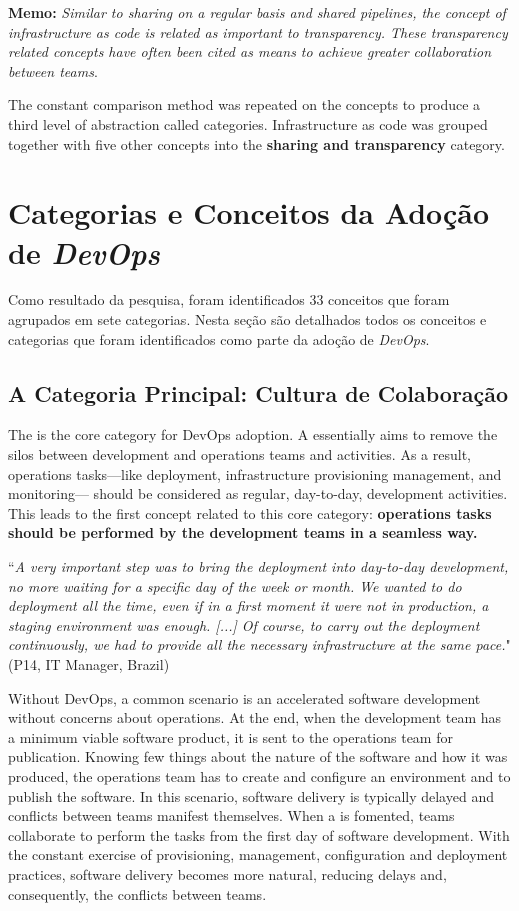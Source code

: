 \textbf{Memo:} \textit{Similar to sharing on a regular basis and shared
pipelines, the concept of infrastructure as code is related as important to
transparency. These transparency related concepts have often been cited as
means to achieve greater collaboration between teams}.

The constant comparison method was repeated on the concepts to produce a third
level of abstraction called categories. Infrastructure as code was grouped
together with five other concepts into the \textbf{sharing and transparency} category.


\section{Categorias e Conceitos da Adoção de \textit{DevOps}}

Como resultado da pesquisa, foram identificados 33 conceitos que foram agrupados
em sete categorias. Nesta seção são detalhados todos os conceitos e categorias
que foram  identificados como parte da adoção de \textit{DevOps}.

\subsection{A Categoria Principal: Cultura de Colaboração}

The \cc is the core category
for DevOps adoption. A \cc essentially aims to remove
the silos between development and operations teams and activities.
As a result, operations tasks---like deployment, infrastructure provisioning
management, and monitoring--- should be considered as regular, day-to-day,
development activities. This leads to the first concept related to
this core category: {\bf operations tasks should be performed by
the development teams in a seamless way.}

\begin{mq}
``\emph{A very important step was to bring the deployment into day-to-day
development, no more waiting for a specific day of the week or month. We wanted
to do deployment all the time, even if in a first moment it were not in
production, a staging environment was enough. [...] Of course, to carry out the deployment
continuously, we had to provide all the necessary infrastructure at the same
pace.}" (P14, IT Manager, Brazil)
\end{mq}

Without DevOps, a common scenario is an accelerated software development
without concerns about operations. At the end, when the development team has a
minimum viable software product, it is sent to the operations team for
publication. Knowing few things about the nature of the software and how it
was produced, the operations team has to create and configure an environment
and to publish the software. In this scenario, software delivery is typically
delayed and conflicts between teams manifest themselves. When a \cc is fomented, teams collaborate to perform the tasks from the first day
of software development. With the constant exercise of provisioning, management,
configuration and deployment practices, software delivery becomes more natural,
reducing delays and, consequently, the conflicts between teams.

